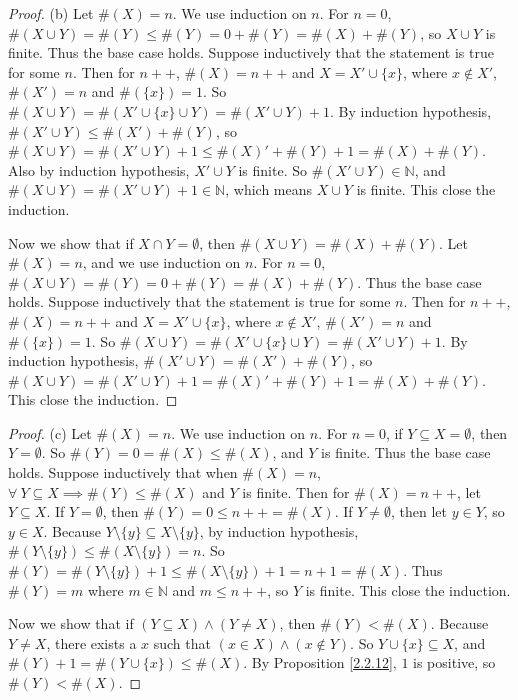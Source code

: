 \begin{proof}{(b)}
Let \(\#(X) = n\).
We use induction on \(n\).
For \(n = 0\), \(\#(X \cup Y) = \#(Y) \leq \#(Y) = 0 + \#(Y) = \#(X) + \#(Y)\), so \(X \cup Y\) is finite.
Thus the base case holds.
Suppose inductively that the statement is true for some \(n\).
Then for \(n++\), \(\#(X) = n++\) and \(X = X' \cup \{x\}\), where \(x \notin X'\), \(\#(X') = n\) and \(\#(\{x\}) = 1\).
So \(\#(X \cup Y) = \#(X' \cup \{x\} \cup Y) = \#(X' \cup Y) + 1\).
By induction hypothesis, \(\#(X' \cup  Y) \leq \#(X') + \#(Y)\), so \(\#(X \cup  Y) = \#(X' \cup  Y) + 1 \leq \#(X)' + \#(Y) + 1 = \#(X) + \#(Y)\).
Also by induction hypothesis, \(X' \cup Y\) is finite.
So \(\#(X' \cup Y) \in \mathds{N}\), and \(\#(X \cup Y) = \#(X' \cup Y) + 1 \in \mathds{N}\), which means \(X \cup Y\) is finite.
This close the induction.

Now we show that if \(X \cap Y = \emptyset\), then \(\#(X \cup Y) = \#(X) + \#(Y)\).
Let \(\#(X) = n\), and we use induction on \(n\).
For \(n = 0\), \(\#(X \cup Y) = \#(Y) = 0 + \#(Y) = \#(X) + \#(Y)\).
Thus the base case holds.
Suppose inductively that the statement is true for some \(n\).
Then for \(n++\), \(\#(X) = n++\) and \(X = X' \cup \{x\}\), where \(x \notin X'\), \(\#(X') = n\) and \(\#(\{x\}) = 1\).
So \(\#(X \cup Y) = \#(X' \cup \{x\} \cup Y) = \#(X' \cup Y) + 1\).
By induction hypothesis, \(\#(X' \cup  Y) = \#(X') + \#(Y)\), so \(\#(X \cup  Y) = \#(X' \cup  Y) + 1 = \#(X)' + \#(Y) + 1 = \#(X) + \#(Y)\).
This close the induction.
\end{proof}

\begin{proof}{(c)}
Let \(\#(X) = n\).
We use induction on \(n\).
For \(n = 0\), if \(Y \subseteq X = \emptyset\), then \(Y = \emptyset\).
So \(\#(Y) = 0 = \#(X) \leq \#(X)\), and \(Y\) is finite.
Thus the base case holds.
Suppose inductively that when \(\#(X) = n\), \(\forall\ Y \subseteq X \implies \#(Y) \leq \#(X)\) and \(Y\) is finite.
Then for \(\#(X) = n++\), let \(Y \subseteq X\).
If \(Y = \emptyset\), then \(\#(Y) = 0 \leq n++ = \#(X)\).
If \(Y \neq \emptyset\), then let \(y \in Y\), so \(y \in X\).
Because \(Y \setminus \{y\}  \subseteq X \setminus \{y\}\), by induction hypothesis, \(\#(Y \setminus \{y\}) \leq \#(X \setminus \{y\}) = n\).
So \(\#(Y) = \#(Y \setminus \{y\}) + 1 \leq \#(X \setminus \{y\}) + 1 = n + 1 = \#(X)\).
Thus \(\#(Y) = m\) where \(m \in \mathds{N}\) and \(m \leq n++\), so \(Y\) is finite.
This close the induction.

Now we show that if \((Y \subseteq X) \land (Y \neq X)\), then \(\#(Y) < \#(X)\).
Because \(Y \neq X\), there exists a \(x\) such that \((x \in X) \land (x \notin Y)\).
So \(Y \cup \{x\} \subseteq X\), and \(\#(Y) + 1 = \#(Y \cup \{x\}) \leq \#(X)\).
By Proposition \ref{2.2.12}, \(1\) is positive, so \(\#(Y) < \#(X)\).
\end{proof}

